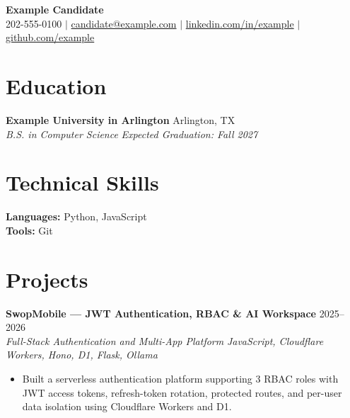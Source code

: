 \documentclass[10pt, letterpaper]{article}
\begin{document}
\begin{center}
  {\LARGE \textbf{Example Candidate}} \\[3pt]
  \small
  202-555-0100 $|$
  \href{mailto:candidate@example.com}{candidate@example.com} $|$
  \href{https://linkedin.com/in/example}{linkedin.com/in/example} $|$
  \href{https://github.com/example}{github.com/example}
\end{center}

\vspace{-2pt}

\section{Education}

\noindent
\textbf{Example University in Arlington} \hfill Arlington, TX \\
\textit{B.S. in Computer Science} \hfill \textit{Expected Graduation: Fall 2027}

\vspace{2pt}

\section{Technical Skills}

\noindent
\textbf{Languages:} Python, JavaScript \\
\textbf{Tools:} Git

\vspace{2pt}

\section{Projects}

\noindent
\textbf{SwopMobile — JWT Authentication, RBAC \& AI Workspace} \hfill 2025–2026 \\
\textit{Full-Stack Authentication and Multi-App Platform} \hfill \textit{JavaScript, Cloudflare Workers, Hono, D1, Flask, Ollama}
\begin{itemize}
  \item Built a serverless authentication platform supporting 3 RBAC roles with JWT access tokens, refresh-token rotation, protected routes, and per-user data isolation using Cloudflare Workers and D1.
\end{itemize}
\end{document}
